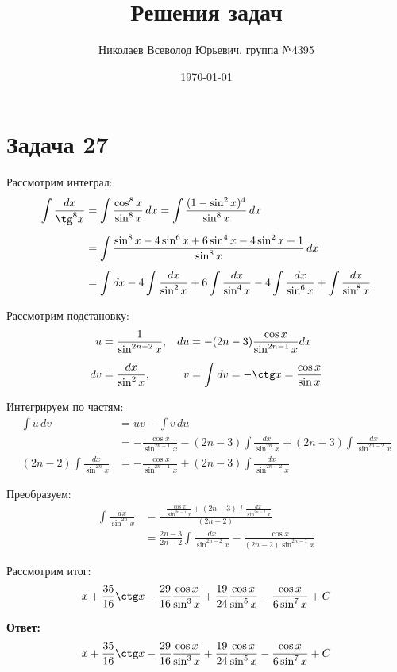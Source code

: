 \documentclass[a4paper,12pt]{article}
\begin{document}
\title{Решения задач}
\author{Николаев Всеволод Юрьевич, группа №4395}
\date{\today}
\maketitle

\flushleft  

\section*{Задача 27}

Рассмотрим интеграл:
\begin{align}
    \int \frac{dx}{\tg^8 x} &= \int \frac{\cos^8 x}{\sin^8 x}\, dx = 
    \int \frac{(1 - \sin^2 x)^4}{\sin^8 x}\, dx  \\[5pt]
    &= \int \frac{\sin^8 x - 4 \sin^6 x + 6 \sin^4 x - 4 \sin^2 x + 1}{\sin^8 x}\, dx \\[5pt]
    &= \int dx - 4 \int \frac{dx}{\sin^2 x} + 6 \int \frac{dx}{\sin^4 x} 
        - 4 \int \frac{dx}{\sin^6 x} + \int \frac{dx}{\sin^8 x}
\end{align}

Рассмотрим подстановку:
\begin{align}
    u &= \frac{1}{\sin^{2n-2} x},  & du &= -(2n - 3) \frac{\cos x}{\sin^{2n-1} x} dx \\[5pt]
    dv &= \frac{dx}{\sin^{2} x},  & v &= \int dv = -\ctg x = \frac{\cos x}{\sin x}
\end{align}

Интегрируем по частям:
\begin{align}
    \int u\, dv &= uv - \int v\, du \\
    &= -\frac{\cos x}{\sin^{2n-1} x} - (2n - 3) \int \frac{dx}{\sin^{2n} x}  + (2n - 3) \int \frac{dx}{\sin^{2n - 2} x} \\[5pt]
    (2n - 2) \int \frac{dx}{\sin^{2n} x} &= -\frac{\cos x}{\sin^{2n-1} x} + (2n - 3) \int \frac{dx}{\sin^{2n - 2} x}
\end{align}

Преобразуем:
\begin{align}
    \int \frac{dx}{\sin^{2n} x} &= \frac{-\frac{\cos x}{\sin^{2n-1} x} + (2n - 3) \int \frac{dx}{\sin^{2n - 2} x}}{(2n - 2)} \\
    &= \frac{2n - 3}{2n - 2} \int \frac{dx}{\sin^{2n - 2} x} - \frac{\cos x}{(2n - 2) \sin^{2n-1} x}
\end{align}

Рассмотрим итог:
\begin{align}
    x + \frac{35}{16} \ctg x - \frac{29}{16} \frac{\cos x}{\sin^3 x} 
    + \frac{19}{24} \frac{\cos x}{\sin^5 x} - \frac{\cos x}{6 \sin^7 x} + C
\end{align}

\textbf{Ответ:}
\begin{align}
    x + \frac{35}{16} \ctg x - \frac{29}{16} \frac{\cos x}{\sin^3 x} 
    + \frac{19}{24} \frac{\cos x}{\sin^5 x} - \frac{\cos x}{6 \sin^7 x} + C
\end{align}
\end{document}
